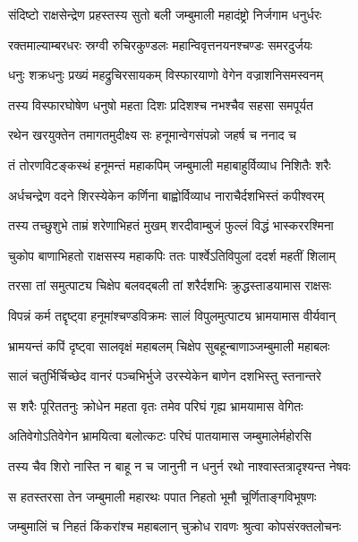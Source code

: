 
\twolineshloka
{संदिष्टो राक्षसेन्द्रेण प्रहस्तस्य सुतो बली}
{जम्बुमाली महादंष्ट्रो निर्जगाम धनुर्धरः} %

\twolineshloka
{रक्तमाल्याम्बरधरः स्रग्वी रुचिरकुण्डलः}
{महान्विवृत्तनयनश्चण्डः समरदुर्जयः} %

\twolineshloka
{धनुः शक्रधनुः प्रख्यं महद्रुचिरसायकम्}
{विस्फारयाणो वेगेन वज्राशनिसमस्वनम्} %

\twolineshloka
{तस्य विस्फारघोषेण धनुषो महता दिशः}
{प्रदिशश्च नभश्चैव सहसा समपूर्यत} %

\twolineshloka
{रथेन खरयुक्तेन तमागतमुदीक्ष्य सः}
{हनूमान्वेगसंपन्नो जहर्ष च ननाद च} %

\twolineshloka
{तं तोरणविटङ्कस्थं हनूमन्तं महाकपिम्}
{जम्बुमाली महाबाहुर्विव्याध निशितैः शरैः} %

\twolineshloka
{अर्धचन्द्रेण वदने शिरस्येकेन कर्णिना}
{बाह्वोर्विव्याध नाराचैर्दशभिस्तं कपीश्वरम्} %

\twolineshloka
{तस्य तच्छुशुभे ताम्रं शरेणाभिहतं मुखम्}
{शरदीवाम्बुजं फुल्लं विद्धं भास्कररश्मिना} %

\twolineshloka
{चुकोप बाणाभिहतो राक्षसस्य महाकपिः}
{ततः पार्श्वेऽतिविपुलां ददर्श महतीं शिलाम्} %

\twolineshloka
{तरसा तां समुत्पाट्य चिक्षेप बलवद्बली}
{तां शरैर्दशभिः क्रुद्धस्ताडयामास राक्षसः} %

\twolineshloka
{विपन्नं कर्म तद्दृष्ट्वा हनूमांश्चण्डविक्रमः}
{सालं विपुलमुत्पाट्य भ्रामयामास वीर्यवान्} %

\twolineshloka
{भ्रामयन्तं कपिं दृष्ट्वा सालवृक्षं महाबलम्}
{चिक्षेप सुबहून्बाणाञ्जम्बुमाली महाबलः} %

\twolineshloka
{सालं चतुर्भिर्चिच्छेद वानरं पञ्चभिर्भुजे}
{उरस्येकेन बाणेन दशभिस्तु स्तनान्तरे} %

\twolineshloka
{स शरैः पूरिततनुः क्रोधेन महता वृतः}
{तमेव परिघं गृह्य भ्रामयामास वेगितः} %

\twolineshloka
{अतिवेगोऽतिवेगेन भ्रामयित्वा बलोत्कटः}
{परिघं पातयामास जम्बुमालेर्महोरसि} %

\twolineshloka
{तस्य चैव शिरो नास्ति न बाहू न च जानुनी}
{न धनुर्न रथो नाश्वास्तत्रादृश्यन्त नेषवः} %

\twolineshloka
{स हतस्तरसा तेन जम्बुमाली महारथः}
{पपात निहतो भूमौ चूर्णिताङ्गविभूषणः} %

\twolineshloka
{जम्बुमालिं च निहतं किंकरांश्च महाबलान्}
{चुक्रोध रावणः श्रुत्वा कोपसंरक्तलोचनः} %

